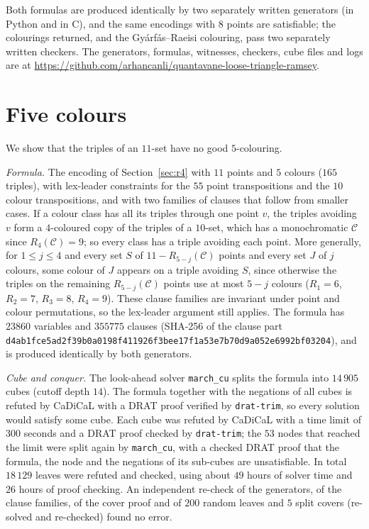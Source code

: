 \documentclass[11pt]{amsart}
\theoremstyle{definition}
\theoremstyle{remark}
\newcommand{\C}{\mathcal{C}}
\begin{document}
Both formulas are produced identically by two separately written generators (in Python and in C), and the same
encodings with $8$ points are satisfiable; the colourings returned, and the Gy\'arf\'as--Raeisi colouring, pass two
separately written checkers. The generators, formulas, witnesses, checkers, cube files and logs are at
\url{https://github.com/arhancanli/quantavane-loose-triangle-ramsey}.

\section{Five colours}\label{sec:r5}

We show that the triples of an $11$-set have no good $5$-colouring.

\emph{Formula.} The encoding of Section~\ref{sec:r4} with $11$ points and $5$ colours ($165$ triples), with
lex-leader constraints for the $55$ point transpositions and the $10$ colour transpositions, and with two families of
clauses that follow from smaller cases. If a colour class has all its triples through one point $v$, the triples
avoiding $v$ form a $4$-coloured copy of the triples of a $10$-set, which has a monochromatic $\C$ since
$R_4(\C)=9$; so every class has a triple avoiding each point. More generally, for $1\le j\le4$ and every set $S$ of
$11-R_{5-j}(\C)$ points and every set $J$ of $j$ colours, some colour of $J$ appears on a triple avoiding $S$, since
otherwise the triples on the remaining $R_{5-j}(\C)$ points use at most $5-j$ colours ($R_1=6$, $R_2=7$, $R_3=8$,
$R_4=9$). These clause families are invariant under point and colour permutations, so the lex-leader argument still
applies. The formula has $23860$ variables and $355775$ clauses (SHA-256 of the clause part
\texttt{d4ab1fce5ad2f39b0a0198f411926f3b}\-\texttt{ee17f1a53e7b70d9a052e6992bf03204}), and is produced identically by
both generators.

\emph{Cube and conquer.} The look-ahead solver \texttt{march\_cu} splits the formula into $14\,905$ cubes (cutoff depth
$14$). The formula together with the negations of all cubes is refuted by CaDiCaL with a DRAT proof verified by
\texttt{drat-trim}, so every solution would satisfy some cube. Each cube was refuted by CaDiCaL with a time limit of
$300$ seconds and a DRAT proof checked by \texttt{drat-trim}; the $53$ nodes that reached the limit were split again
by \texttt{march\_cu}, with a checked DRAT proof that the formula, the node and the negations of its sub-cubes are
unsatisfiable. In total $18\,129$ leaves were refuted and checked, using about $49$ hours of solver time and $26$ hours
of proof checking. An independent re-check of the generators, of the clause families, of the cover proof and of $200$
random leaves and $5$ split covers (re-solved and re-checked) found no error.
\end{document}
